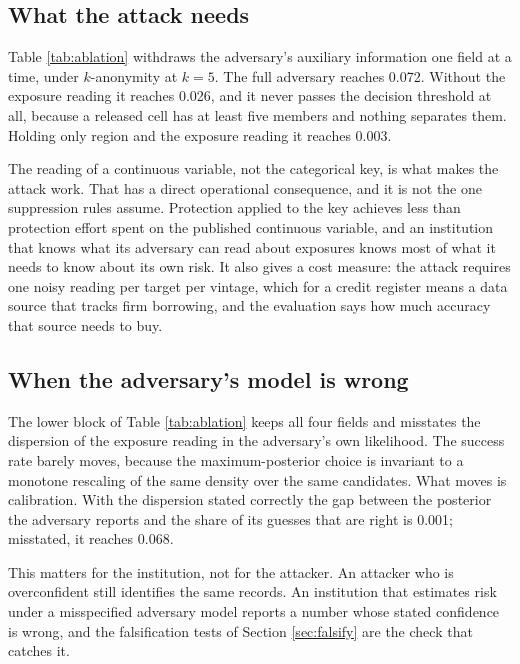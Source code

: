 \documentclass[11pt,a4paper]{article}
\theoremstyle{plain}
\theoremstyle{definition}
\begin{document}
\subsection{What the attack needs}\label{sec:eval-cost}



Table \ref{tab:ablation} withdraws the adversary's auxiliary information one field
at a time, under $k$-anonymity at $k=5$. The full adversary reaches
0.072. Without the exposure reading it reaches
0.026, and it never passes the decision threshold at all,
because a released cell has at least five members and nothing separates them.
Holding only region and the exposure reading it reaches 0.003.

The reading of a continuous variable, not the categorical key, is what makes the
attack work. That has a direct operational consequence, and it is not the one
suppression rules assume. Protection applied to the key achieves less than
protection effort spent on the published continuous variable, and an institution
that knows what its adversary can read about exposures knows most of what it needs
to know about its own risk. It also gives a cost measure: the attack requires one
noisy reading per target per vintage, which for a credit register means a data
source that tracks firm borrowing, and the evaluation says how much accuracy that
source needs to buy.

\subsection{When the adversary's model is wrong}\label{sec:eval-shift}

The lower block of Table \ref{tab:ablation} keeps all four fields and misstates the
dispersion of the exposure reading in the adversary's own likelihood. The success
rate barely moves, because the maximum-posterior choice is invariant to a monotone
rescaling of the same density over the same candidates. What moves is calibration.
With the dispersion stated correctly the gap between the posterior the adversary
reports and the share of its guesses that are right is 0.001;
misstated, it reaches 0.068.

This matters for the institution, not for the attacker. An attacker who is
overconfident still identifies the same records. An institution that estimates risk
under a misspecified adversary model reports a number whose stated confidence is
wrong, and the falsification tests of Section \ref{sec:falsify} are the check that
catches it.
\end{document}
